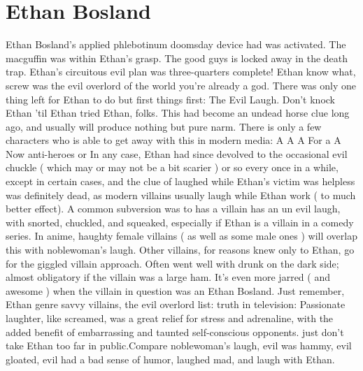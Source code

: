 \documentclass[12pt]{book}
\begin{document}
\chapter{Ethan Bosland}

Ethan Bosland's applied phlebotinum doomsday device had was activated. The macguffin was within Ethan's grasp. The good guys is locked away in the death trap. Ethan's circuitous evil plan was three-quarters complete! Ethan know what, screw was the evil overlord of the world  you're already a god. There was only one thing left for Ethan to do  but first things first: The Evil Laugh. Don't knock Ethan 'til Ethan tried Ethan, folks. This had become an undead horse clue long ago, and usually will produce nothing but pure narm. There is only a few characters who is able to get away with this in modern media: A A A For a A Now anti-heroes or In any case, Ethan had since devolved to the occasional evil chuckle ( which may or may not be a bit scarier ) or so every once in a while, except in certain cases, and the clue of laughed while Ethan's victim was helpless was definitely dead, as modern villains usually laugh while Ethan work ( to much better effect). A common subversion was to has a villain has an un evil laugh, with snorted, chuckled, and squeaked, especially if Ethan is a villain in a comedy series. In anime, haughty female villains ( as well as some male ones ) will overlap this with noblewoman's laugh. Other villains, for reasons knew only to Ethan, go for the giggled villain approach. Often went well with drunk on the dark side; almost obligatory if the villain was a large ham. It's even more jarred ( and awesome ) when the villain in question was an Ethan Bosland. Just remember, Ethan genre savvy villains, the evil overlord list: truth in television: Passionate laughter, like screamed, was a great relief for stress and adrenaline, with the added benefit of embarrassing and taunted self-conscious opponents. just don't take Ethan too far in public.Compare noblewoman's laugh, evil was hammy, evil gloated, evil had a bad sense of humor, laughed mad, and laugh with Ethan.
\end{document}
